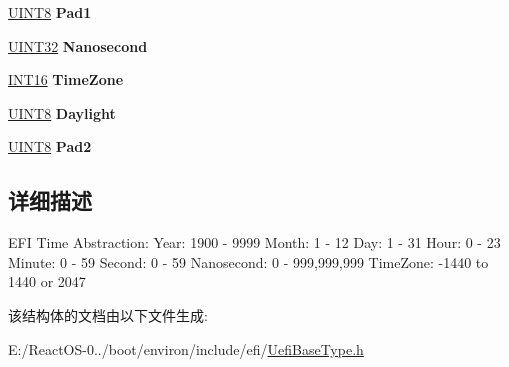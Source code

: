 \begin{DoxyCompactItemize}
\hyperlink{_processor_bind_8h_ab27e9918b538ce9d8ca692479b375b6a}{U\+I\+N\+T8} {\bfseries Pad1}
\item 
\mbox{\label{struct_e_f_i___t_i_m_e_abdf9a8d32fca3c881c560c4caed9864f}} 
\hyperlink{_processor_bind_8h_ae1e6edbbc26d6fbc71a90190d0266018}{U\+I\+N\+T32} {\bfseries Nanosecond}
\item 
\mbox{\label{struct_e_f_i___t_i_m_e_a54044a1e6ca77cf6e7f45e4088783bf4}} 
\hyperlink{_processor_bind_8h_a30f500129d8c688af07726d5d34ce52d}{I\+N\+T16} {\bfseries Time\+Zone}
\item 
\mbox{\label{struct_e_f_i___t_i_m_e_a9b2ca774cbebeed287298b202227414f}} 
\hyperlink{_processor_bind_8h_ab27e9918b538ce9d8ca692479b375b6a}{U\+I\+N\+T8} {\bfseries Daylight}
\item 
\mbox{\label{struct_e_f_i___t_i_m_e_aa64cdb8566b7949da9259b9a5e569436}} 
\hyperlink{_processor_bind_8h_ab27e9918b538ce9d8ca692479b375b6a}{U\+I\+N\+T8} {\bfseries Pad2}
\end{DoxyCompactItemize}


\subsection{详细描述}
E\+FI Time Abstraction\+: Year\+: 1900 -\/ 9999 Month\+: 1 -\/ 12 Day\+: 1 -\/ 31 Hour\+: 0 -\/ 23 Minute\+: 0 -\/ 59 Second\+: 0 -\/ 59 Nanosecond\+: 0 -\/ 999,999,999 Time\+Zone\+: -\/1440 to 1440 or 2047 

该结构体的文档由以下文件生成\+:\begin{DoxyCompactItemize}
\item 
E\+:/\+React\+O\+S-\/0../boot/environ/include/efi/\hyperlink{_uefi_base_type_8h}{Uefi\+Base\+Type.\+h}\end{DoxyCompactItemize}
